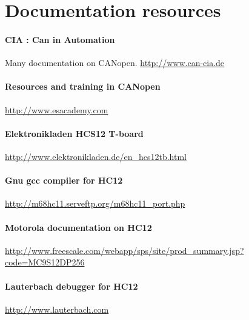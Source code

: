 \documentclass[a4paper,12pt]{book}
\newcommand{\canopen}{CANopen}
\begin{document}
\section{Documentation resources\newline}
\paragraph{CIA : Can in Automation\newline}
Many documentation on \canopen{}.\newline
\href{http://www.can-cia.de/}{http://www.can{}-cia.de}

\paragraph{Resources and training in \canopen{}\newline}
\href{http://www.esacademy.com/}{http://www.esacademy.com}

\paragraph{Elektronikladen HCS12 T{}-board\newline}
\href{http://www.elektronikladen.de/en_hcs12tb.html}{http://www.elektronikladen.de/en\_hcs12tb.html}

\paragraph{Gnu gcc compiler for HC12\newline}
\href{http://m68hc11.serveftp.org/m68hc11_port.php}{http://m68hc11.serveftp.org/m68hc11\_port.php}

\paragraph{Motorola documentation on HC12\newline}
\href{http://www.freescale.com/webapp/sps/site/prod_summary.jsp?code=MC9S12DP256}{http://www.freescale.com/webapp/sps/site/prod\_summary.jsp?code=MC9S12DP256}

\paragraph{Lauterbach debugger for HC12\newline}
\href{http://www.lauterbach.com/}{http://www.lauterbach.com}
\end{document}
